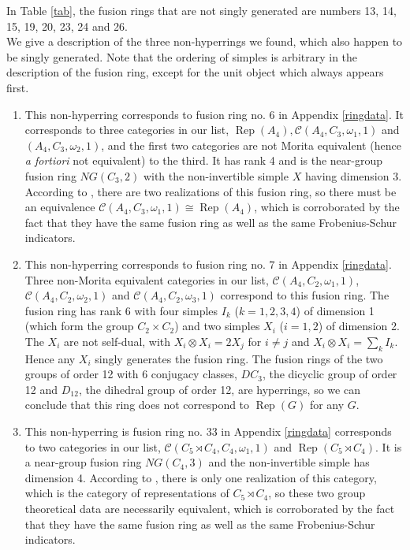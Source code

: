 \documentclass[a4paper, 10pt]{book}
\theoremstyle{definition}
\numberwithin{equation}{chapter}
\newcommand\ot{\otimes}
\newcommand\Rep{\operatorname{Rep}}
\newcommand\C{\mathcal C}
\newcommand\semidir\rtimes
\begin{document}
In Table \ref{tab}, the fusion rings that are not singly generated are numbers 13, 14, 15, 19, 20, 23, 24 and 26.\\
We give a description of the three non-hyperrings we found, which also happen to be singly generated. Note that the ordering of simples is arbitrary in the description of the fusion ring, except for the unit object which always appears first.
\begin{enumerate}
	\item This non-hyperring corresponds to fusion ring no. 6 in Appendix \ref{ringdata}. It corresponds to three categories in our list, $\Rep(A_4), \C(A_4, C_3, \omega_1, 1)$ and $(A_4, C_3, \omega_2, 1)$, and the first two categories are not Morita equivalent (hence \textit{a fortiori} not equivalent) to the third. It has rank 4 and is the near-group fusion ring $NG(C_3, 2)$ with the non-invertible simple $X$ having dimension 3. According to \cite[Corollary 7.4]{MR2098028}, there are two realizations of this fusion ring, so there must be an equivalence $\C(A_4, C_3, \omega_1, 1)\cong \Rep(A_4)$, which is corroborated by the fact that they have the same fusion ring as well as the same Frobenius-Schur indicators.
	\item This non-hyperring corresponds to fusion ring no. 7 in Appendix \ref{ringdata}. Three non-Morita equivalent categories in our list, $\C(A_4, C_2, \omega_1, 1)$, $\C(A_4, C_2, \omega_2, 1)$ and $\C(A_4, C_2, \omega_3, 1)$ correspond to this fusion ring. The fusion ring has rank 6 with four simples $I_k$ ($k=1, 2, 3, 4$) of dimension 1 (which form the group $C_2
\times C_2$) and two simples $X_i$ ($i=1, 2$) of dimension 2. The $X_i$ are not self-dual, with $X_i\ot X_i = 2X_j$ for $i\neq j$ and  $X_i \ot X_i = \sum_k I_k$. Hence any $X_i$ singly generates the fusion ring. The fusion rings of the two groups of order 12 with 6 conjugacy classes, $DC_3$, the dicyclic group of order 12 and $D_{12}$, the dihedral group of order 12, are hyperrings, so we can conclude that this ring does not correspond to $\Rep(G)$ for any $G$.

	\item This non-hyperring is fusion ring no. 33 in Appendix \ref{ringdata} corresponds to two categories in our list, $\C(C_5\semidir C_4, C_4, \omega_1, 1)$ and $ \Rep(C_5\semidir C_4)$.  It is a near-group fusion ring  $NG(C_4, 3)$ and the non-invertible simple has dimension 4. According to \cite[Corollary 7.4]{MR2098028}, there is only one realization of this category, which is the category of representations of $C_5\semidir C_4$, so these two group theoretical data are necessarily equivalent, which is corroborated by the fact that they have the same fusion ring as well as the same Frobenius-Schur indicators.

\end{enumerate}
\end{document}

